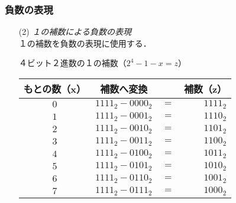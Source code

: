 \documentclass{beamer}                 %
\begin{document}
\begin{frame}
  \frametitle{負数の表現}
\begin{enumerate}
\item[(2)] \emph{１の補数による負数の表現}\\
  １の補数を負数の表現に使用する．
  \begin{itembox}[l]{４ビット２進数の１の補数（$2^4 - 1 - x = z$）}
    \begin{tabular}{ c | r c r}
      \hline
      \hline
      もとの数（x） & \multicolumn{1}{|c}{補数へ変換}
      & & \multicolumn{1}{c}{補数（z）} \\
      \hline
      $0$  & $1111_2 - 0000_2$ & $=$ & $1111_2$ \\
      $1$  & $1111_2 - 0001_2$ & $=$ & $1110_2$ \\
      $2$  & $1111_2 - 0010_2$ & $=$ & $1101_2$ \\
      $3$  & $1111_2 - 0011_2$ & $=$ & $1100_2$ \\
      $4$  & $1111_2 - 0100_2$ & $=$ & $1011_2$ \\
      $5$  & $1111_2 - 0101_2$ & $=$ & $1010_2$ \\
      $6$  & $1111_2 - 0110_2$ & $=$ & $1001_2$ \\
      $7$  & $1111_2 - 0111_2$ & $=$ & $1000_2$ \\
    \end{tabular}
  \end{itembox}
\end{enumerate}
\end{frame}
\end{document}
